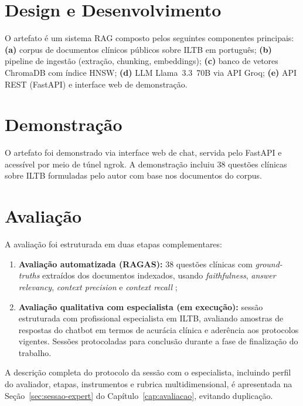 \documentclass[
  12pt,
  oneside,
  a4paper,
  english,
  brazil
]{abntex2}
\begin{document}
\section{Design e Desenvolvimento}

O artefato é um sistema RAG composto pelos seguintes componentes principais:
\textbf{(a)} corpus de documentos clínicos públicos sobre ILTB em português;
\textbf{(b)} pipeline de ingestão (extração, chunking, embeddings);
\textbf{(c)} banco de vetores ChromaDB com índice HNSW;
\textbf{(d)} LLM Llama~3.3~70B via API Groq;
\textbf{(e)} API REST (FastAPI) e interface web de demonstração.

\section{Demonstração}

O artefato foi demonstrado via interface web de chat, servida pelo FastAPI e
acessível por meio de túnel ngrok. A demonstração incluiu 38 questões clínicas
sobre ILTB formuladas pelo autor com base nos documentos do corpus.

\section{Avaliação}

A avaliação foi estruturada em duas etapas complementares:

\begin{enumerate}[label=\textbf{(\arabic*)}]
  \item \textbf{Avaliação automatizada (RAGAS):} 38 questões clínicas com
        \textit{ground-truths} extraídos dos documentos indexados, usando
        \textit{faithfulness}, \textit{answer relevancy}, \textit{context
        precision} e \textit{context recall} \cite{es2024};
  \item \textbf{Avaliação qualitativa com especialista (em execução):}
        sessão estruturada com profissional especialista em ILTB,
        avaliando amostras de respostas do chatbot em termos de acurácia
        clínica e aderência aos protocolos vigentes. Sessões protocoladas
        para conclusão durante a fase de finalização do trabalho.
\end{enumerate}

A descrição completa do protocolo da sessão com o especialista, incluindo perfil
do avaliador, etapas, instrumentos e rubrica multidimensional, é apresentada na
Seção~\ref{sec:sessao-expert} do Capítulo~\ref{cap:avaliacao}, evitando duplicação.
\end{document}
